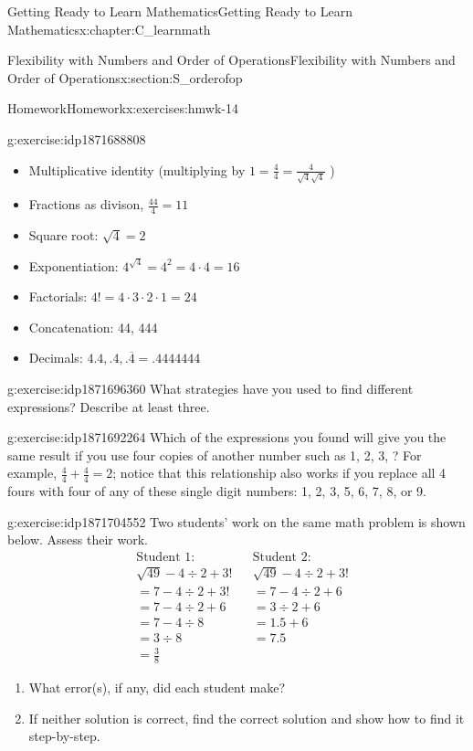 \documentclass[oneside,10pt,]{book}
\numberwithin{equation}{chapter}
\newcommand{\amp}{&}
\begin{document}
\begin{chapterptx}{Getting Ready to Learn Mathematics}{}{Getting Ready to Learn Mathematics}{}{}{x:chapter:C_learnmath}
\begin{sectionptx}{Flexibility with Numbers and Order of Operations}{}{Flexibility with Numbers and Order of Operations}{}{}{x:section:S_orderofop}
\begin{exercises-subsection}{Homework}{}{Homework}{}{}{x:exercises:hmwk-14}
\begin{divisionexercise}{5}{}{}{g:exercise:idp1871688808}
\begin{itemize}[label=\textbullet]
\item{}Multiplicative identity (multiplying by \(1= \frac{4}{4}=\frac{4}{\sqrt4\sqrt4}\) )%
\item{}Fractions as divison, \(\frac{44}{4} = 11\)%
\item{}Square root: \(\sqrt{4} = 2\)%
\item{}Exponentiation: \(4^{\sqrt4}=4^2=4 \cdot 4=16\)%
\item{}Factorials: \(4! = 4 \cdot 3 \cdot 2 \cdot 1 = 24\)%
\item{}Concatenation: 44, 444%
\item{}Decimals: \(4.4, .4, . \overline{4} = .4444444\) \textellipsis{}%
\end{itemize}
%
\end{divisionexercise}%
\begin{divisionexercise}{6}{}{}{g:exercise:idp1871696360}%
What strategies have you used to find different expressions? Describe at least three.%
\end{divisionexercise}%
\begin{divisionexercise}{7}{}{}{g:exercise:idp1871692264}%
Which of the expressions you found will give you the same result if you use four copies of another number such as 1, 2, 3, \textellipsis{}? For example, \(\frac{4}{4}+\frac{4}{4}=2\); notice that this relationship also works if you replace all 4 fours with four of any of these single digit numbers: 1, 2, 3, 5, 6, 7, 8, or 9.%
\end{divisionexercise}%
\begin{divisionexercise}{8}{}{}{g:exercise:idp1871704552}%
Two students' work on the same math problem is shown below. Assess their work.%
\begin{align*}
\amp \text{Student 1:} \amp \amp \text{Student 2:}\\
\amp \sqrt{49} - 4 \div 2 + 3! \amp \amp \sqrt{49} - 4 \div 2 + 3!\\
\amp = 7 - 4 \div 2 + 3! \amp \amp = 7 - 4 \div 2 + 6\\
\amp = 7 - 4 \div 2 + 6 \amp \amp = 3 \div 2 +6\\
\amp = 7 - 4 \div 8 \amp \amp = 1.5 + 6\\
\amp = 3 \div 8 \amp \amp = 7.5\\
\amp = \frac{3}{8} \amp \amp
\end{align*}
%
\begin{enumerate}[font=\bfseries,label=(\alph*),ref=\alph*]
\item{}What error(s), if any, did each student make?%
\item{}If neither solution is correct, find the correct solution and show how to find it step-by-step.%

\end{enumerate}
\end{divisionexercise}
\end{exercises-subsection}
\end{sectionptx}
\end{chapterptx}
\end{document}
